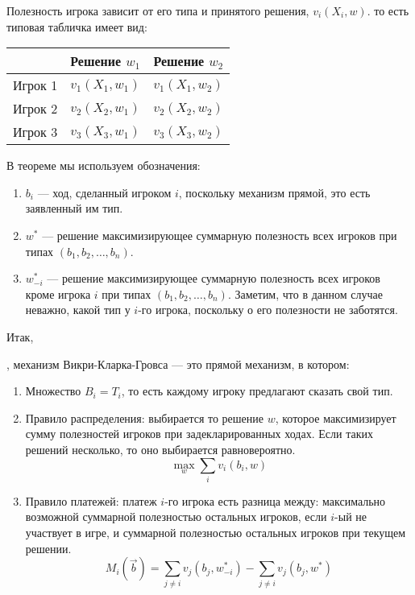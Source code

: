 Полезность игрока зависит от его типа и принятого решения, $ v_{i}(X_{i},w) $. то есть типовая табличка имеет вид:

\begin{tabular}{c|cc}
& Решение $ w_{1} $ & Решение $ w_{2} $ \\
\hline
Игрок 1 & $v_{1}(X_{1},w_{1})$ & $v_{1}(X_{1},w_{2})$ \\
Игрок 2 & $v_{2}(X_{2},w_{1})$ & $v_{2}(X_{2},w_{2})$ \\
Игрок 3 & $v_{3}(X_{3},w_{1})$ & $v_{3}(X_{3},w_{2})$ \\
\end{tabular}


В теореме мы используем обозначения:

\begin{enumerate}
\item $b_{i}$ — ход, сделанный игроком $ i $, поскольку механизм прямой, это есть заявленный им тип.
\item $w^{*}$ — решение максимизирующее суммарную полезность всех игроков при типах $ (b_{1},b_{2},\ldots,b_{n}) $.
\item $w_{-i}^{*} $ — решение максимизирующее суммарную полезность всех игроков кроме игрока $ i $ при типах $ (b_{1},b_{2},\ldots,b_{n}) $. Заметим, что в данном случае неважно, какой тип у $ i $-го игрока, поскольку о его полезности не заботятся.
\end{enumerate}

Итак,
\begin{mydef} , механизм Викри-Кларка-Гровса — это прямой механизм, в котором:
\begin{enumerate}
\item Множество $ B_{i}=T_{i} $, то есть каждому игроку предлагают сказать свой тип.
\item Правило распределения: выбирается то решение $ w $, которое максимизирует сумму полезностей игроков при задекларированных ходах. Если таких решений несколько, то оно выбирается равновероятно.
\begin{equation}
\max_{w} \sum_{i} v_{i}(b_{i},w)
\end{equation}
\item Правило платежей: платеж $ i $-го игрока есть разница между: максимально возможной суммарной полезностью остальных игроков, если $ i $-ый не участвует в игре, и суммарной полезностью остальных игроков при текущем решении.
\begin{equation}
M_{i}(\vec{b})=\sum_{j\neq i} v_{j}(b_{j},w_{-i}^{*})-\sum_{j\neq i} v_{j}(b_{j},w^{*})
\end{equation}
\end{enumerate}
\end{mydef}

